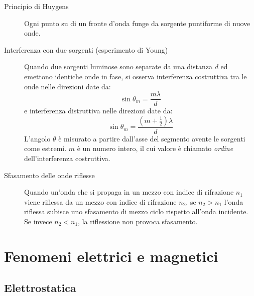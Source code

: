 \documentclass[a4paper,11pt,italian]{article}
\begin{document}
\begin{description}
  \item[Principio di Huygens] 
  Ogni punto su di un fronte d'onda funge da sorgente puntiforme di nuove onde.
  
  \item[Interferenza con due sorgenti (esperimento di Young)] 
  Quando due sorgenti luminose sono separate da una distanza $ d $ ed emettono identiche onde in fase, si osserva interferenza costruttiva tra le onde nelle direzioni date da:
  \[ \sin \theta_m = \frac{m\lambda}{d} \]
  e interferenza distruttiva nelle direzioni date da:
  \[ \sin \theta_m = \frac{(m + \frac{1}{2})\lambda}{d} \]
  L'angolo $ \theta $ è misurato a partire dall'asse del segmento avente le sorgenti come estremi. $ m $ è un numero intero, il cui valore è chiamato \emph{ordine} dell'interferenza costruttiva.

  
  \item[Sfasamento delle onde riflesse] 
  Quando un'onda che si propaga in un mezzo con indice di rifrazione $ n_1 $ viene riflessa da un mezzo con indice di rifrazione $ n_2 $, se $ n_2 > n_1 $ l'onda riflessa subisce uno sfasamento di mezzo ciclo rispetto all'onda incidente. Se invece $ n_2 < n_1 $, la riflessione non provoca sfasamento.
\end{description}


\newpage
\section{Fenomeni elettrici e magnetici}

\subsection{Elettrostatica}
\end{document}
